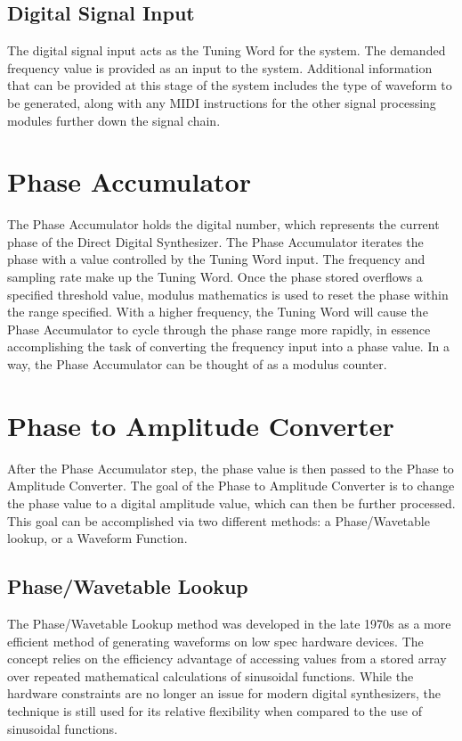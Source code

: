 \documentclass[a4paper,12pt]{report}
\begin{document}
\subsection{Digital Signal Input}
The digital signal input acts as the Tuning Word for the system. The demanded frequency value is provided as an input to the system. Additional information that can be provided at this stage of the system includes the type of waveform to be generated, along with any MIDI instructions for the other signal processing modules further down the signal chain.

\section{Phase Accumulator}
The Phase Accumulator holds the digital number, which represents the current phase of the Direct Digital Synthesizer. The Phase Accumulator iterates the phase with a value controlled by the Tuning Word input. The frequency and sampling rate make up the Tuning Word. Once the phase stored overflows a specified threshold value, modulus mathematics is used to reset the phase within the range specified. With a higher frequency, the Tuning Word will cause the Phase Accumulator to cycle through the phase range more rapidly, in essence accomplishing the task of converting the frequency input into a phase value. In a way, the Phase Accumulator can be thought of as a modulus counter.

\section{Phase to Amplitude Converter}
After the Phase Accumulator step, the phase value is then passed to the Phase to Amplitude Converter. The goal of the Phase to Amplitude Converter is to change the phase value to a digital amplitude value, which can then be further processed. This goal can be accomplished via two different methods: a Phase/Wavetable lookup, or a Waveform Function.

\subsection{Phase/Wavetable Lookup}
The Phase/Wavetable Lookup method was developed in the late 1970s as a more efficient method of generating waveforms on low spec hardware devices. The concept relies on the efficiency advantage of accessing values from a stored array over repeated mathematical calculations of sinusoidal functions. While the hardware constraints are no longer an issue for modern digital synthesizers, the technique is still used for its relative flexibility when compared to the use of sinusoidal functions.
\end{document}
